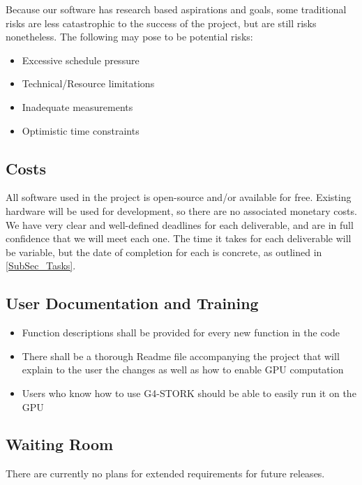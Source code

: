\documentclass[12pt]{article}
\newcommand{\todo}[1]{\textcolor{red}{[TODO: #1]}} \else
\newcommand{\authornote}[3]{} \newcommand{\todo}[1]{} \fi
\newcommand{\ds}[1]{\authornote{blue}{DS}{#1}} %
\begin{document}
Because our software has research based aspirations and goals, some traditional risks are less catastrophic to the success of the project, but are still risks nonetheless. The following may pose to be potential risks:\\

\begin{itemize}
	\item Excessive schedule pressure
	\item Technical/Resource limitations
	\item Inadequate measurements 
	\ds{What do you mean by this?}
	\item Optimistic time constraints
\end{itemize}

\subsection{Costs} %
All software used in the project is open-source and/or available for free. Existing hardware will be used for development, so there are no associated monetary costs.\\

We have very clear and well-defined deadlines for each deliverable, and are in full confidence that we will meet each one. The time it takes for each deliverable will be variable, but the date of completion for each is concrete, as outlined in \ref{SubSec_Tasks}.

\subsection{User Documentation and Training} %
\begin{itemize}
	\item Function descriptions shall be provided for every new function in the code
	\item There shall be a thorough Readme file accompanying the project that will explain to the user the changes as well as how to enable GPU computation
	\item Users who know how to use G4-STORK should be able to easily run it on the GPU
\end{itemize}

\subsection{Waiting Room} %
There are currently no plans for extended requirements for future releases.
\end{document}
